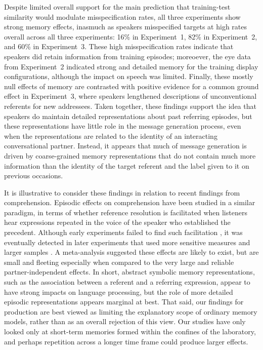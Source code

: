 \documentclass[natbib,doc,a4paper]{apa6}
\begin{document}
Despite limited overall support for the main prediction that training-test similarity would modulate misspecification rates, all three experiments show strong memory effects, inasmuch as speakers misspecified targets at high rates overall across all three experiments: 16\% in Experiment~1, 82\% in Experiment~2, and 60\% in Experiment~3.  These high misspecification rates indicate that speakers did retain information from training episodes; moreoever, the eye data from Experiment~2 indicated strong and detailed memory for the training display configurations, although the impact on speech was limited. Finally, these mostly null effects of memory are contrasted with positive evidence for a common ground effect in Experiment~3, where speakers lengthened descriptions of unconventional referents for new addressees. Taken together, these findings support the idea that speakers do maintain detailed representations about past referring episodes, but these representations have little role in the message generation process, even when the representations are related to the identity of an interacting conversational partner.  Instead, it appears that much of message generation is driven by coarse-grained memory representations that do not contain much more information than the identity of the target referent and the label given to it on previous occasions.

It is illustrative to consider these findings in relation to recent findings from comprehension. Episodic effects on comprehension have been studied in a similar paradigm, in terms of whether reference resolution is facilitated when listeners hear expressions repeated in the voice of the speaker who established the precedent. Although early experiments failed to find such facilitation \citep{barrkeysar02,metzingbrennan03}, it was eventually detected in later experiments that used more sensitive measures and larger samples \citep{brown-schmidt09prec}. A meta-analysis suggested these effects are likely to exist, but are small and fleeting \citep{kronmuller_barr_2015} especially when compared to the very large and reliable partner-independent effects. In short, abstract symbolic memory representations, such as the association between a referent and a referring expression, appear to have strong impacts on language processing, but the role of more detailed episodic representations appears marginal at best. That said, our findings for production are best viewed as limiting the explanatory scope of ordinary memory models, rather than as an overall rejection of this view. Our studies have only looked only at short-term memories formed within the confines of the laboratory, and perhaps repetition across a longer time frame could produce larger effects.
\end{document}
